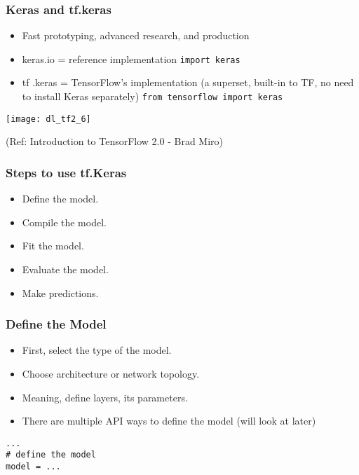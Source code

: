 


\begin{frame}[fragile] \frametitle{Keras and tf.keras}

\begin{itemize}
\item  Fast prototyping, advanced research, and production
\item keras.io = reference implementation \lstinline|import keras|
\item tf .keras  = TensorFlow’s implementation (a superset, built-in to TF, no need to install Keras separately) \lstinline|from tensorflow import keras|
\end{itemize}

\begin{center}
\texttt{[image: dl\_tf2\_6]}
\end{center}

\tiny{(Ref: Introduction to TensorFlow 2.0 - Brad Miro)}
\end{frame}

\begin{frame}[fragile] \frametitle{Steps to use tf.Keras}

\begin{itemize}
\item  Define the model.
\item  Compile the model.
\item  Fit the model.
\item  Evaluate the model.
\item  Make predictions.
\end{itemize}
\end{frame}

\begin{frame}[fragile] \frametitle{Define the Model}

\begin{itemize}
\item  First, select the type of the model.
\item Choose architecture or network topology.
\item Meaning, define layers, its parameters.
\item There are multiple API ways to define the model (will look at later)
\end{itemize}

\begin{lstlisting}
...
# define the model
model = ...
\end{lstlisting}
\end{frame}

